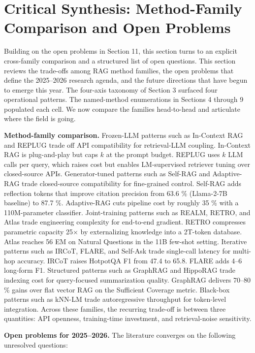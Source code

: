 \section{Critical Synthesis: Method-Family Comparison and Open Problems}\label{critical-synthesis-method-family-comparison-and-open-problems}

Building on the open problems in Section 11, this section turns to an explicit cross-family comparison and a structured list of open questions. This section reviews the trade-offs among RAG method families, the open problems that define the 2025--2026 research agenda, and the future directions that have begun to emerge this year. The four-axis taxonomy of Section 3 surfaced four operational patterns. The named-method enumerations in Sections 4 through 9 populated each cell. We now compare the families head-to-head and articulate where the field is going.

\textbf{Method-family comparison.} Frozen-LLM patterns such as In-Context RAG and REPLUG trade off API compatibility for retrieval-LLM coupling. In-Context RAG is plug-and-play but caps \(k\) at the prompt budget. REPLUG uses \(k\) LLM calls per query, which raises cost but enables LM-supervised retriever tuning over closed-source APIs. Generator-tuned patterns such as Self-RAG and Adaptive-RAG trade closed-source compatibility for fine-grained control. Self-RAG adds reflection tokens that improve citation precision from 63.6 \% (Llama-2-7B baseline) to 87.7 \%. Adaptive-RAG cuts pipeline cost by roughly 35 \% with a 110M-parameter classifier. Joint-training patterns such as REALM, RETRO, and Atlas trade engineering complexity for end-to-end gradient. RETRO compresses parametric capacity 25× by externalizing knowledge into a 2T-token database. Atlas reaches 56 EM on Natural Questions in the 11B few-shot setting. Iterative patterns such as IRCoT, FLARE, and Self-Ask trade single-call latency for multi-hop accuracy. IRCoT raises HotpotQA F1 from 47.4 to 65.8. FLARE adds 4--6 long-form F1. Structured patterns such as GraphRAG and HippoRAG trade indexing cost for query-focused summarization quality. GraphRAG delivers 70--80 \% gains over flat vector RAG on the Sufficient Coverage metric. Black-box patterns such as kNN-LM trade autoregressive throughput for token-level integration. Across these families, the recurring trade-off is between three quantities: API openness, training-time investment, and retrieval-noise sensitivity.

\textbf{Open problems for 2025--2026.} The literature converges on the following unresolved questions:

